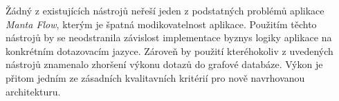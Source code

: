 Žádný z existujících nástrojů neřeší jeden z podstatných problémů aplikace \textit{Manta Flow}, kterým je špatná modikovatelnost aplikace. Použitím těchto nástrojů by se neodstranila závislost implementace byznys logiky aplikace na konkrétním dotazovacím jazyce. Zároveň by použití kteréhokoliv z uvedených nástrojů znamenalo zhoršení výkonu dotazů do grafové databáze. Výkon je přitom jedním ze zásadních kvalitavních kritérií pro nově navrhovanou architekturu.
